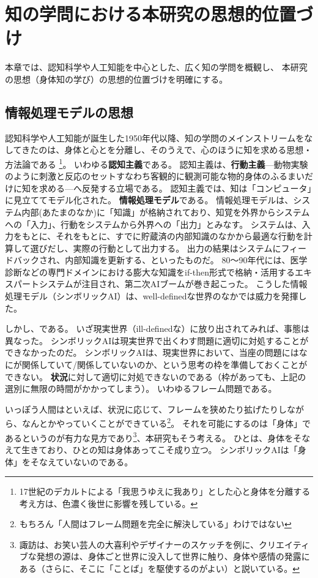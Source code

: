 \chapter{知の学問における本研究の思想的位置づけ}
\label{chapter:embodiedwisdom}
本章では、認知科学や人工知能を中心とした、広く知の学問を概観し、
本研究の思想（身体知の学び）の思想的位置づけを明確にする。

\section{情報処理モデルの思想}
\label{sec:aiboom}
認知科学や人工知能が誕生した1950年代以降、知の学問のメインストリームをなしてきたのは、身体と心とを分離し、そのうえで、心のほうに知を求める思想・方法論である
\footnote{17世紀のデカルトによる「我思うゆえに我あり」とした心と身体を分離する考え方\cite{descartes:1637}は、色濃く後世に影響を残している。
}。
いわゆる\textbf{認知主義}である。
認知主義は、\textbf{行動主義}---動物実験のように刺激と反応のセットすなわち客観的に観測可能な物的身体のふるまいだけに知を求める---へ反発する立場である。
認知主義では、知は「コンピュータ」に見立ててモデル化された。
\textbf{情報処理モデル}である。
情報処理モデルは、システム内部(あたまのなか)に「知識」が格納されており、知覚を外界からシステムへの「入力」、行動をシステムから外界への「出力」とみなす。
システムは、入力をもとに、それをもとに、すでに貯蔵済の内部知識のなかから最適な行動を計算して選びだし、実際の行動として出力する。
出力の結果はシステムにフィードバックされ、内部知識を更新する、といったものだ。
80〜90年代には、医学診断などの専門ドメインにおける膨大な知識をif-then形式で格納・活用するエキスパートシステムが注目され、第二次AIブームが巻き起こった。
こうした情報処理モデル（シンボリックAI）は、well-definedな世界のなかでは威力を発揮した。

しかし、である。
いざ現実世界（ill-definedな）に放り出されてみれば、事態は異なった。
シンボリックAIは現実世界で出くわす問題に適切に対処することができなかったのだ。
シンボリックAIは、現実世界において、当座の問題にはなにが関係していて/関係していないのか、という思考の枠を準備しておくことができない。
\textbf{状況}に対して適切に対処できないのである（枠があっても、上記の選別に無限の時間がかかってしまう）。
いわゆるフレーム問題\cite{McCHay:69,dennett:1984}である。

いっぽう人間はといえば、状況に応じて、フレームを狭めたり拡げたりしながら、なんとかやっていく\cite{decerteau:1980}ことができている\footnote{もちろん「人間はフレーム問題を完全に解決している」わけではない}。
それを可能にするのは「身体」であるというのが有力な見方であり\footnote{
  諏訪\cite{suwa:2018}は、お笑い芸人の大喜利やデザイナーのスケッチを例に、クリエイティブな発想の源は、身体ごと世界に没入して世界に触り、身体や感情の発露にある（さらに、そこに「ことば」を駆使するのがよい）と説いている。
}、本研究もそう考える。
ひとは、身体をそなえて生きており、ひとの知は身体あってこそ成り立つ。
シンボリックAIは「身体」をそなえていないのである。

